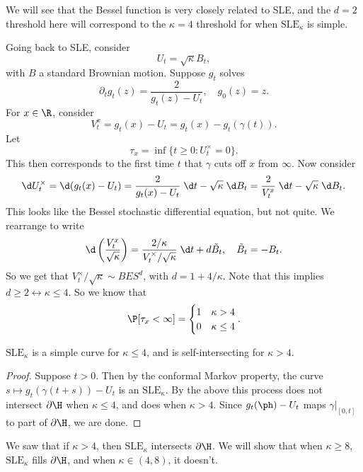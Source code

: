 \documentclass[a4paper]{article}
\newcommand\SLE{\mathrm{SLE}}
\begin{document}
We will see that the Bessel function is very closely related to SLE, and the $d = 2$ threshold here will correspond to the $\kappa = 4$ threshold for when $\SLE_\kappa$ is simple.

Going back to SLE, consider
\[
  U_t = \sqrt{\kappa} B_t,
\]
with $B$ a standard Brownian motion. Suppose $g_t$ solves
\[
  \partial_t g_t(z) = \frac{2}{g_t(z) - U_t},\quad g_0(z) = z.
\]
For $x \in \R$, consider
\[
  V_t^x = g_t(x) - U_t = g_t(x) - g_t(\gamma(t)).
\]
Let
\[
  \tau_x = \inf \{t \geq 0: U_t^\times = 0\}.
\]
This then corresponds to the first time $t$ that $\gamma$ cuts off $x$ from $\infty$. Now consider
\[
  \d U_t^\times = \d (g_t(x) - U_t) = \frac{2}{g_t(x) - U_t}\;\d t - \sqrt{\kappa}\;\d B_t = \frac{2}{V_t^x}\;\d t - \sqrt{\kappa} \;\d B_t.
\]
This looks like the Bessel stochastic differential equation, but not quite. We rearrange to write
\[
  \d \left(\frac{V_t^x}{\sqrt{\kappa}}\right) = \frac{2/\kappa}{V_t^\times/\sqrt{\kappa}} \;\d t + d \tilde{B}_t,\quad \tilde{B}_t = - B_t.
\]
So we get that $V_t^\times/\sqrt{\kappa} \sim BES^d$, with $d = 1 + 4/\kappa$. Note that this implies $d \geq 2 \leftrightarrow \kappa \leq 4$. So we know that
\[
  \P[\tau_x < \infty] =
  \begin{cases}
    1 & \kappa > 4\\
    0 & \kappa \leq 4
  \end{cases}.
\]
\begin{prop}
  $\SLE_\kappa$ is a simple curve for $\kappa \leq 4$, and is self-intersecting for $\kappa > 4$.
\end{prop}

\begin{proof}
  Suppose $t > 0$. Then by the conformal Markov property, the curve $s \mapsto g_t(\gamma(t + s)) - U_t$ is an $\SLE_\kappa$. By the above this process does not intersect $\partial \H$ when $\kappa \leq 4$, and does when $\kappa > 4$. Since $g_t(\ph) - U_t$ maps $\gamma|_{[0, t]}$ to part of $\partial \H$, we are done.
\end{proof}

We saw that if $\kappa > 4$, then $\SLE_\kappa$ intersects $\partial \H$. We will show that when $\kappa \geq 8$, $\SLE_\kappa$ fills $\partial \H$, and when $\kappa \in (4, 8)$, it doesn't.
\printindex
\end{document}
